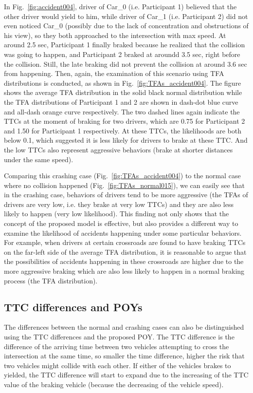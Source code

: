 In Fig.~\ref{fig:accident004}, driver of Car\_0 (i.e. Participant 1) believed that the other driver would yield to him, while driver of Car\_1 (i.e. Participant 2) did not even noticed Car\_0 (possibly due to the lack of concentration and obstructions of his view), so they both approached to the intersection with max speed. At around 2.5 sec, Participant 1 finally braked because he realized that the collision was going to happen, and Participant 2 braked at aroundd 3.5 sec, right before the collision. Still, the late braking did not prevent the collision at around 3.6 sec from happening. Then, again, the examination of this scenario using TFA distributions is conducted, as shown in Fig.~\ref{fig:TFAs_accident004}. The figure shows the average TFA distribution in the solid black normal distribution while the TFA distributions of Participant 1 and 2 are shown in dash-dot blue curve and all-dash orange curve respectively. The two dashed lines again indicate the TTCs at the moment of braking for two drivers, which are 0.75 for Participant 2 and 1.50 for Participant 1 respectively. At these TTCs, the likelihoods are both below 0.1, which suggested it is less likely for drivers to brake at these TTC. And the low TTCs also represent aggressive behaviors (brake at shorter distances under the same speed).

Comparing this crashing case (Fig.~\ref{fig:TFAs_accident004}) to the normal case where no collision happened (Fig.~\ref{fig:TFAs_normal015}), we can easily see that in the crashing case, behaviors of drivers tend to be more aggressive (the TFAs of drivers are very low, i.e. they brake at very low TTCs) and they are also less likely to happen (very low likelihood). This finding not only shows that the concept of the proposed model is effective, but also provides a different way to examine the likelihood of accidents happening under some particular behaviors. For example, when drivers at certain crossroads are found to have braking TTCs on the far-left side of the average TFA distribution, it is reasonable to argue that the possibilities of accidents happening in these crossroads are higher due to the more aggressive braking which are also less likely to happen in a normal braking process (the TFA distribution).


\subsection{TTC differences and POYs}
The differences between the normal and crashing cases can also be distinguished using the TTC differences and the proposed POY. The TTC difference is the difference of the arriving time between two vehicles attempting to cross the intersection at the same time, so smaller the time difference, higher the risk that two vehicles might collide with each other. If either of the vehicles brakes to yielded, the TTC difference will start to expand due to the increasing of the TTC value of the braking vehicle (because the decreasing of the vehicle speed). 

